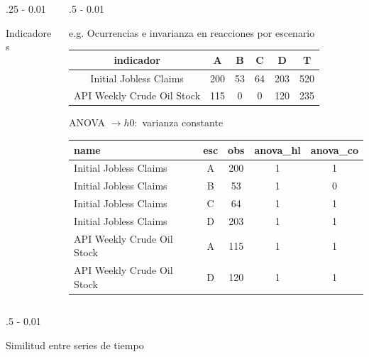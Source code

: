\documentclass{iteraposter}\usepackage[]{graphicx}\usepackage[]{color}
\begin{document}
\begin{frame}
\begin{columns}[onlytextwidth]
\begin{column}{.25 \textwidth - 0.01 \textwidth}
\begin{block}{Indicadores}
      
    \end{block}
  \end{column}
  
  \begin{column}{.5 \textwidth - 0.01 \textwidth}
    \begin{block}{e.g. Ocurrencias e invarianza en reacciones por escenario}
      \centering
      
\begin{tabular}{c|c|c|c|c|c}
\hline
indicador & A & B & C & D & T\\
\hline
Initial Jobless Claims & 200 & 53 & 64 & 203 & 520\\
\hline
API Weekly Crude Oil Stock & 115 & 0 & 0 & 120 & 235\\
\hline
\end{tabular}


      ANOVA $\rightarrow h0:$ varianza constante
      
\begin{tabular}{l|c|c|c|c}
\hline
name & esc & obs & anova\_hl & anova\_co\\
\hline
Initial Jobless Claims & A & 200 & 1 & 1\\
\hline
Initial Jobless Claims & B & 53 & 1 & 0\\
\hline
Initial Jobless Claims & C & 64 & 1 & 1\\
\hline
Initial Jobless Claims & D & 203 & 1 & 1\\
\hline
API Weekly Crude Oil Stock & A & 115 & 1 & 1\\
\hline
API Weekly Crude Oil Stock & D & 120 & 1 & 1\\
\hline
\end{tabular}


    \end{block}
  \end{column}


\end{columns}


\begin{columns}[onlytextwidth]
  
  \begin{column}{.5 \textwidth - 0.01 \textwidth}
    \begin{block}{Similitud entre series de tiempo}
      

\end{block}
\end{column}
\end{columns}
\end{frame}
\end{document}
